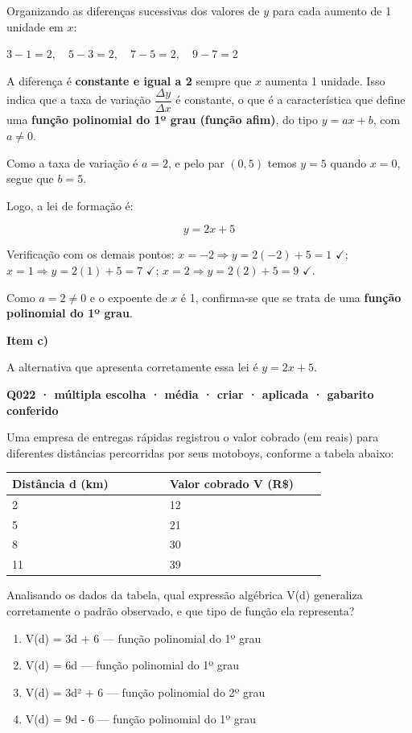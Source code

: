 \documentclass[11pt,a4paper]{article}
\begin{document}
Organizando as diferenças sucessivas dos valores de $y$ para cada aumento de 1 unidade em $x$:

$3-1=2,\quad 5-3=2,\quad 7-5=2,\quad 9-7=2$

A diferença é \textbf{constante e igual a 2} sempre que $x$ aumenta 1 unidade. Isso indica que a taxa de variação $\dfrac{\Delta y}{\Delta x}$ é constante, o que é a característica que define uma \textbf{função polinomial do 1º grau (função afim)}, do tipo $y = ax+b$, com $a\neq 0$.

Como a taxa de variação é $a=2$, e pelo par $(0,5)$ temos $y=5$ quando $x=0$, segue que $b=5$.

Logo, a lei de formação é:

$$y = 2x+5$$

Verificação com os demais pontos: $x=-2 \Rightarrow y=2(-2)+5=1$ $\checkmark$; $x=1 \Rightarrow y=2(1)+5=7$ $\checkmark$; $x=2 \Rightarrow y=2(2)+5=9$ $\checkmark$.

Como $a=2\neq 0$ e o expoente de $x$ é 1, confirma-se que se trata de uma \textbf{função polinomial do 1º grau}.

\textbf{Item c)}

A alternativa que apresenta corretamente essa lei é $y=2x+5$.

\bigskip\noindent\textbf{Q022 · múltipla escolha · média · criar · aplicada · gabarito conferido}\par\nopagebreak
Uma empresa de entregas rápidas registrou o valor cobrado (em reais) para diferentes distâncias percorridas por seus motoboys, conforme a tabela abaixo:

\begin{center}
\begin{tabular}{|p{0.430\linewidth}|p{0.430\linewidth}|}
\hline
\textbf{Distância d (km)} & \textbf{Valor cobrado V (R\$)} \\
\hline
2 & 12 \\
\hline
5 & 21 \\
\hline
8 & 30 \\
\hline
11 & 39 \\
\hline
\end{tabular}
\end{center}

Analisando os dados da tabela, qual expressão algébrica V(d) generaliza corretamente o padrão observado, e que tipo de função ela representa?
\begin{enumerate}[label=(\alph*)]
\item V(d) = 3d + 6 — função polinomial do 1º grau
\item V(d) = 6d — função polinomial do 1º grau
\item V(d) = 3d² + 6 — função polinomial do 2º grau
\item V(d) = 9d - 6 — função polinomial do 1º grau
\end{enumerate}
\end{document}
